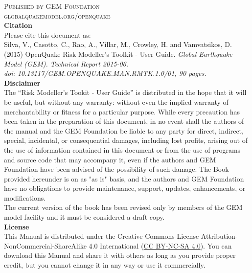 \noindent \textsc{Published by GEM Foundation}\\ %

\noindent \textsc{globalquakemodel.org/openquake}\\ %

\noindent
   {\textbf{Citation}} \hfill \\
   Please cite this document as:\\
   Silva, V., Casotto, C., Rao, A., Villar, M., Crowley, H. and Vamvatsikos, D. (2015) OpenQuake Risk Modeller's Toolkit - User Guide. 
   \textit{Global Earthquake Model (GEM). Technical Report 2015-06.\\ 
   doi: 10.13117/GEM.OPENQUAKE.MAN.RMTK.1.0/01, 90 pages.} \hfill \\

   {\bf{Disclaimer}} \hfill \\
\noindent
   The ``Risk Modeller's Tookit - User Guide'' is distributed in the hope 
   that it will be useful, but without any warranty: without 
   even the implied warranty of merchantability or fitness for a 
   particular purpose. While every 
   precaution has been taken in the preparation of this document, in 
   no event shall the authors of the manual and the GEM Foundation be 
   liable to any party for direct, indirect, special, incidental, or 
   consequential damages, including lost profits, arising out of the 
   use of information contained in this document or from the use of 
   programs and source code that may accompany it, even if the authors 
   and GEM Foundation have been advised of the possibility of such damage. 
   The Book provided hereunder is on as "as is" basis, and the authors 
   and GEM Foundation have no obligations to provide maintenance, support,
   updates, enhancements, or modifications. 
   \hfill \\
   The current version of the book has been revised only by members of 
   the GEM model facility and it must be considered a draft copy. 
   \vspace{0.4cm} \hfill \\
   {\bf{License}} \hfill \\
   This Manual is distributed under the Creative Commons License 
   Attribution-NonCommercial-ShareAlike 4.0 International 
   (\href{http://creativecommons.org/licenses/by-nc-sa/4.0/}
   {CC BY-NC-SA 4.0}). 
   You can download this Manual and share it with 
   others as long as you provide proper credit, but you cannot change 
   it in any way or use it commercially.\hfill \\

